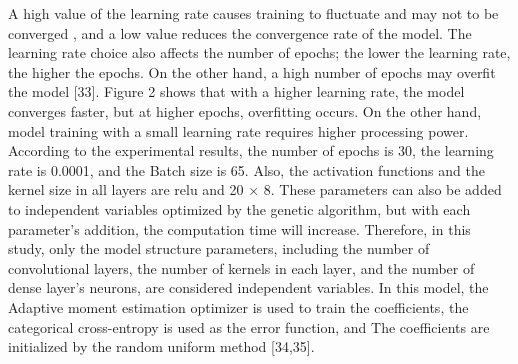 A high value of the learning rate causes training to fluctuate and may not to be converged , and a low value reduces the convergence rate of the model. The learning rate choice also affects the number of epochs; the lower the learning rate, the higher the epochs. On the other hand, a high number of epochs may overfit the model [33]. Figure 2 shows that with a higher learning rate, the model converges faster, but at higher epochs, overfitting occurs. On the other hand, model training with a small learning rate requires higher processing power. According to the experimental results, the number of epochs is 30, the learning rate is 0.0001, and the Batch size is 65. Also, the activation functions and the kernel size in all layers are relu and 20 × 8.  These parameters can also be added to independent variables optimized by the genetic algorithm, but with each parameter's addition, the computation time will increase. Therefore, in this study, only the model structure parameters, including the number of convolutional layers, the number of kernels in each layer, and the number of dense layer's neurons, are considered independent variables. In this model, the Adaptive moment estimation optimizer is used to train the coefficients, the categorical cross-entropy is used as the error function, and The coefficients are initialized by the random uniform method [34,35].


